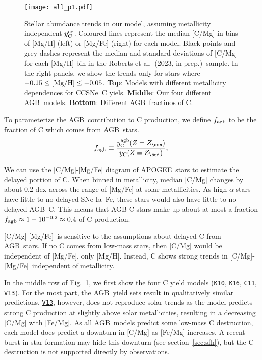 \documentclass[fleqn,
usenatbib]{mnras}
\newcommand{\citetjack}{Roberts et al.~(2023, in prep.)}
\newcommand{\cxi}{\texttt{\hyperlink{C11}{C11}}}
\newcommand{\kx}{\texttt{\hyperlink{K10}{K10}}}
\newcommand{\kxvi}{\texttt{\hyperlink{K16}{K16}}}
\newcommand{\vxiii}{\texttt{\hyperlink{V13}{V13}}}
\newcommand{\agb}{AGB}
\newcommand{\apogee}{APOGEE}
\newcommand{\cc}{CCSNe}
\newcommand{\ia}{SNe Ia}
\newcommand{\caafe}{[C/Mg]-[Mg/Fe]}
\newcommand{\Yct}{\ensuremath{y_{\rm C}}}
\newcommand{\Ycc}{\ensuremath{y_{\rm C}^{\rm cc}}}
\newcommand{\Ycagb}{\ensuremath{y_{\rm C}^{\rm agb}}}
\newcommand{\Zo}{%
    \ifmmode Z_{\sun}%
    \else $Z_{\sun}$%
    \fi}
\begin{document}
\begin{figure}
\texttt{[image: all\_p1.pdf]}

\caption[]{
    Stellar abundance trends in our model, assuming metallicity independent $\Ycc$. Coloured lines represent the median [C/Mg] in bins of [Mg/H] (left) or [Mg/Fe] (right) for each model. Black points and grey dashes represent the median and standard deviations of [C/Mg] for each [Mg/H] bin in the \citetjack~sample. In the right panels, we show the trends only for stars where $-0.15\leq {\rm [Mg/H]}\leq -0.05$.
    \textbf{Top}: Models with different metallicity dependences for  \cc\ C yiels.
    \textbf{Middle}: Our four different \agb\ models.
    \textbf{Bottom}: Different \agb\ fractinos of C.
}
\label{fig:first_models}
\end{figure}




To parameterize the \agb\ contribution to C production, we define $f_{\rm agb}$ to be the fraction of C which comes from \agb\ stars. 
\begin{equation}\label{eq:f_agb}
    f_{\rm agb} \equiv \frac{\Ycagb(Z=\Zo)}{\Yct(Z=\Zo)},
\end{equation}

We can use the \caafe{} diagram of \apogee\ stars to estimate the delayed portion of C. When binned in metallicity, median [C/Mg] changes by about 0.2 dex across the range of [Mg/Fe] at solar metallicities. As high-$\alpha$ stars have little to no delayed \ia\ Fe, these stars would also have little to no delayed \agb\ C. This means that AGB C stars make up about at most a fraction $f_{\rm agb} \approx 1 - 10^{-0.2} \approx 0.4$ of C production.

\caafe\ is sensitive to the assumptions about delayed C from \agb\ stars. If no C comes from low-mass stars, then [C/Mg] would be independent of [Mg/Fe], only [Mg/H]. Instead, C shows strong trends  in \caafe\, independent of metallicity. 

In the middle row of Fig.~\ref{fig:first_models}, we first show the four C yield models (\kx, \kxvi, \cxi, \vxiii). For the most part, the \agb\ yield sets result in qualitatively similar predictions. \vxiii, however, does not reproduce solar trends as the model predicts strong C production at slightly above solar metallicities, resulting in a decreasing [C/Mg] with [Fe/Mg]. 
As all \agb\ models predict some low-mass C destruction, each model does predict a downturn in [C/Mg] as [Fe/Mg] increases. A recent burst in star formation may hide this downturn (see section~\ref{sec:sfh}), but the C destruction is not supported directly by observations. 
\end{document}
